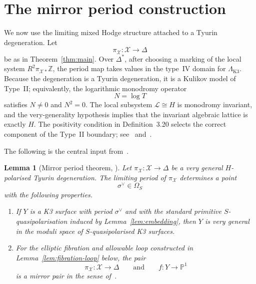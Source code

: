 \documentclass[11pt]{article}
\newtheorem{lemma}[theorem]{Lemma}
\theoremstyle{remark}
\numberwithin{equation}{section}
\begin{document}
\section{The mirror period construction}

We now use the limiting mixed Hodge structure attached to a Tyurin degeneration. Let
\[
\pi_{\mathcal X}\colon \mathcal X\to \Delta
\]
be as in Theorem~\ref{thm:main}. Over \(\Delta^*\), after choosing a marking of the local system \(R^2\pi_{\mathcal X*}\mathbb Z\), the period map takes values in the type~IV domain for \(\Lambda_{\mathrm{K3}}\). Because the degeneration is a Tyurin degeneration, it is a Kulikov model of Type~II; equivalently, the logarithmic monodromy operator
\[
N=\log T
\]
satisfies \(N\neq 0\) and \(N^2=0\). The local subsystem \(\mathcal L\cong H\) is monodromy invariant, and the very-generality hypothesis implies that the invariant algebraic lattice is exactly \(H\). The positivity condition in Definition~3.20 selects the correct component of the Type~II boundary; see~\cite{cmek3sspt} and~\cite{dfk3slpms}.

The following is the central input from~\cite{dfk3slpms}.

\begin{lemma}[Mirror period theorem, {\cite[\S5]{dfk3slpms}}]\label{lem:mirror-period}
Let \(\pi_{\mathcal X}\colon \mathcal X\to \Delta\) be a very general \(H\)-polarised Tyurin degeneration. The limiting period of \(\pi_{\mathcal X}\) determines a point
\[
\sigma^\vee \in \Omega_S
\]
with the following properties.
\begin{enumerate}
  \item If \(Y\) is a K3 surface with period \(\sigma^\vee\) and with the standard primitive \(S\)-quasipolarisation induced by Lemma~\ref{lem:embedding}, then \(Y\) is very general in the moduli space of \(S\)-quasipolarised K3 surfaces.
  \item For the elliptic fibration and allowable loop constructed in Lemma~\ref{lem:fibration-loop} below, the pair
  \[
  \pi_{\mathcal X}\colon \mathcal X\to \Delta
  \qquad\text{and}\qquad
  f\colon Y\to \mathbb P^1
  \]
  is a mirror pair in the sense of~\cite[Definition~5.1]{dfk3slpms}.
\end{enumerate}
\end{lemma}
\end{document}
